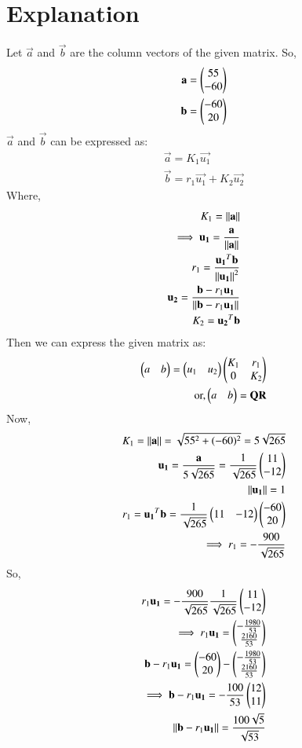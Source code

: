 \documentclass[journal,12pt,twocolumn]{IEEEtran}
\begin{document}
\section{Explanation}
Let $\vec{a}$ and $\vec{b}$ are the column vectors of the given matrix. So,
\begin{align}
\mathbf{a} = \begin{pmatrix}55\\-60\end{pmatrix}\\
\mathbf{b} = \begin{pmatrix}-60\\20\end{pmatrix}
\end{align}
$\vec{a}$ and $\vec{b}$ can be expressed as:
\begin{align}
\vec{a} = K_1 \vec{u_1}\\
\vec{b} = r_1\vec{u_1} + K_2\vec{u_2}
\end{align}
Where,
\begin{align}
K_1= \left\lVert\mathbf{a}\right\rVert\\
\implies \mathbf{u_1} = \frac{\mathbf{a}}{\left\lVert\mathbf{a}\right\rVert}\\
r_1 = \frac{\mathbf{u_1}^T \mathbf{b}}{\left\lVert\mathbf{u_1}\right\rVert^2}\\
\mathbf{u_2}= \frac{\mathbf{b}-r_1\mathbf{u_1}}{\left\lVert\mathbf{b}-r_1\mathbf{u_1}\right\rVert}\\
K_2 = \mathbf{u_2}^T \mathbf{b}
\end{align}
Then we can express the given matrix as:
\begin{align}
\begin{pmatrix}a & b\end{pmatrix} = \begin{pmatrix}u_1 & u_2\end{pmatrix}\begin{pmatrix}K_1 & r_1\\0 & K_2\end{pmatrix}\\
\text{or,} \begin{pmatrix}a & b\end{pmatrix} = \mathbf{Q}\mathbf{R}
\end{align}
Now, 
\begin{align}
K_1 =\left\lVert\mathbf{a}\right\rVert= \sqrt{55^2 + (-60)^2} = 5\sqrt{265}\\
\mathbf{u_1} = \frac{\mathbf{a}}{5\sqrt{265}} = \frac{1}{\sqrt{265}}\begin{pmatrix}11\\-12\end{pmatrix}\\
\left\lVert\mathbf{u_1}\right\rVert = 1\\
r_1= \mathbf{u_1}^T \mathbf{b} = \frac{1}{\sqrt{265}}\begin{pmatrix}11 & -12\end{pmatrix}\begin{pmatrix}-60\\20\end{pmatrix}\\
\implies r_1=-\frac{900}{\sqrt{265}}
\end{align}
So,
\begin{align}
r_1 \mathbf{u_1}= -\frac{900}{\sqrt{265}} \frac{1}{\sqrt{265}}\begin{pmatrix}11\\-12\end{pmatrix}\\
\implies r_1 \mathbf{u_1}=\begin{pmatrix}-\frac{1980}{53}\\\frac{2160}{53}\end{pmatrix}\\
\mathbf{b} - r_1 \mathbf{u_1}= \begin{pmatrix}-60\\20\end{pmatrix} - \begin{pmatrix}-\frac{1980}{53}\\\frac{2160}{53}\end{pmatrix}\\
\implies \mathbf{b} - r_1 \mathbf{u_1} = -\frac{100}{53}\begin{pmatrix}12\\11\end{pmatrix}\\
\left\lVert\mathbf{b} - r_1 \mathbf{u_1}\right\rVert = \frac{100\sqrt{5}}{\sqrt{53}}
\end{align}
\end{document}
